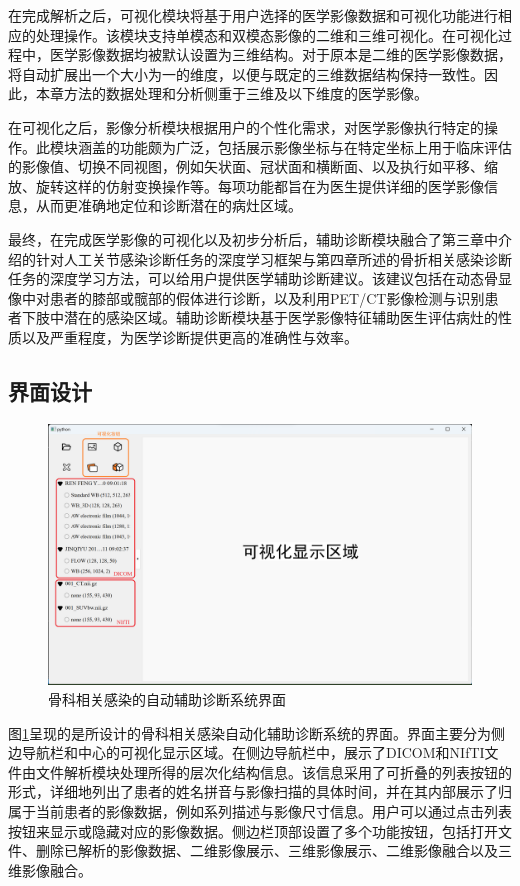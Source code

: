 在完成解析之后，可视化模块将基于用户选择的医学影像数据和可视化功能进行相应的处理操作。该模块支持单模态和双模态影像的二维和三维可视化。在可视化过程中，医学影像数据均被默认设置为三维结构。对于原本是二维的医学影像数据，将自动扩展出一个大小为一的维度，以便与既定的三维数据结构保持一致性。因此，本章方法的数据处理和分析侧重于三维及以下维度的医学影像。

在可视化之后，影像分析模块根据用户的个性化需求，对医学影像执行特定的操作。此模块涵盖的功能颇为广泛，包括展示影像坐标与在特定坐标上用于临床评估的影像值、切换不同视图，例如矢状面、冠状面和横断面、以及执行如平移、缩放、旋转这样的仿射变换操作等。每项功能都旨在为医生提供详细的医学影像信息，从而更准确地定位和诊断潜在的病灶区域。

最终，在完成医学影像的可视化以及初步分析后，辅助诊断模块融合了第三章中介绍的针对人工关节感染诊断任务的深度学习框架与第四章所述的骨折相关感染诊断任务的深度学习方法，可以给用户提供医学辅助诊断建议。该建议包括在动态骨显像中对患者的膝部或髋部的假体进行诊断，以及利用PET/CT影像检测与识别患者下肢中潜在的感染区域。辅助诊断模块基于医学影像特征辅助医生评估病灶的性质以及严重程度，为医学诊断提供更高的准确性与效率。

\subsection{界面设计}

\begin{figure}[htbp]
    \centering
    \includegraphics[width=\textwidth]{figures/chap05_preview.png}
    \caption{骨科相关感染的自动辅助诊断系统界面}
    \label{fig:chap05_preview}
\end{figure}

图\ref{fig:chap05_preview}呈现的是所设计的骨科相关感染自动化辅助诊断系统的界面。界面主要分为侧边导航栏和中心的可视化显示区域。在侧边导航栏中，展示了DICOM和NIfTI文件由文件解析模块处理所得的层次化结构信息。该信息采用了可折叠的列表按钮的形式，详细地列出了患者的姓名拼音与影像扫描的具体时间，并在其内部展示了归属于当前患者的影像数据，例如系列描述与影像尺寸信息。用户可以通过点击列表按钮来显示或隐藏对应的影像数据。侧边栏顶部设置了多个功能按钮，包括打开文件、删除已解析的影像数据、二维影像展示、三维影像展示、二维影像融合以及三维影像融合。

